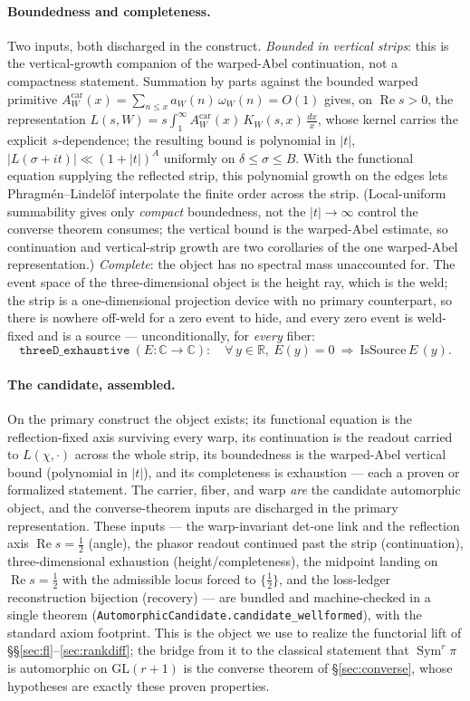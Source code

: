 \documentclass[11pt]{article}
\theoremstyle{definition}
\renewcommand{\Re}{\operatorname{Re}}
\newcommand{\Sym}{\operatorname{Sym}}
\begin{document}
\paragraph{Boundedness and completeness.} Two inputs, both discharged in the construct.
\emph{Bounded in vertical strips}: this is the vertical-growth companion of the warped-Abel continuation,
not a compactness statement. Summation by parts against the bounded warped primitive
$A^{\mathrm{car}}_W(x)=\sum_{n\le x}a_W(n)\,\omega_W(n)=O(1)$ gives, on $\Re s>0$, the representation
$L(s,W)=s\int_1^\infty A^{\mathrm{car}}_W(x)\,K_W(s,x)\,\tfrac{dx}{x}$, whose kernel carries the explicit
$s$-dependence; the resulting bound is polynomial in $|t|$, $|L(\sigma+it)|\ll(1+|t|)^{A}$ uniformly on
$\delta\le\sigma\le B$. With the functional equation supplying the reflected strip, this polynomial growth
on the edges lets Phragm\'en--Lindel\"of \cite[\S5.65]{Titchmarsh} interpolate the finite order across the
strip. (Local-uniform summability gives only \emph{compact} boundedness, not the $|t|\to\infty$ control the
converse theorem consumes; the vertical bound is the warped-Abel estimate, so continuation and
vertical-strip growth are two corollaries of the one warped-Abel representation.)
\emph{Complete}: the object has no spectral mass unaccounted for. The event space of the
three-dimensional object is the height ray, which is the weld; the strip is a one-dimensional
projection device with no primary counterpart, so there is nowhere off-weld for a zero event to hide,
and every zero event is weld-fixed and is a source --- unconditionally, for \emph{every} fiber:
\[
  \texttt{threeD\_exhaustive}\ (E:\mathbb C\to\mathbb C):\quad
  \forall\,y\in\mathbb R,\ E(y)=0\ \Rightarrow\ \mathrm{IsSource}\,E\,(y).
\]

\paragraph{The candidate, assembled.} On the primary construct the object exists; its functional
equation is the reflection-fixed axis surviving every warp, its continuation is the readout carried to
$L(\chi,\cdot)$ across the whole strip, its boundedness is the warped-Abel vertical bound (polynomial in
$|t|$), and its completeness is exhaustion --- each a proven or formalized statement. The carrier, fiber, and warp
\emph{are} the candidate automorphic object, and the converse-theorem inputs are discharged in the
primary representation. These inputs --- the warp-invariant det-one link and the reflection axis
$\Re s=\tfrac12$ (angle), the phasor readout continued past the strip (continuation), three-dimensional
exhaustion (height/completeness), the midpoint landing on $\Re s=\tfrac12$ with the admissible locus
forced to $\{\tfrac12\}$, and the loss-ledger reconstruction bijection (recovery) --- are bundled and
machine-checked in a single theorem (\texttt{AutomorphicCandidate.candidate\_wellformed}), with the
standard axiom footprint. This is the object we use to realize the functorial lift of
\S\S\ref{sec:fl}--\ref{sec:rankdiff}; the bridge from it to the classical statement that $\Sym^r\pi$ is
automorphic on $\mathrm{GL}(r+1)$ is the converse theorem of \S\ref{sec:converse}, whose hypotheses are
exactly these proven properties.
\end{document}
